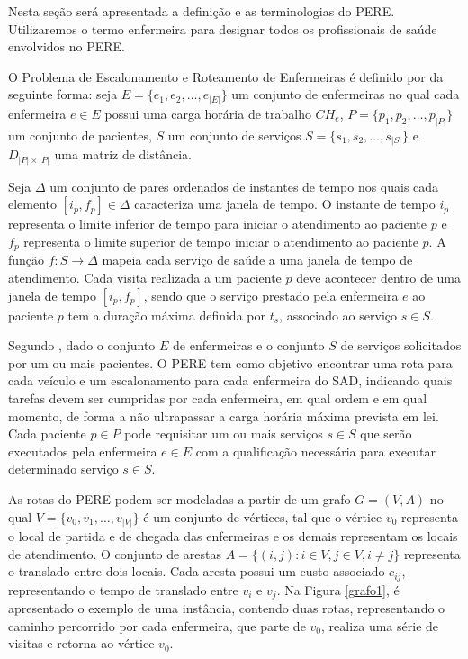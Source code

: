 Nesta seção será apresentada a definição e as terminologias do \ac{PERE}. Utilizaremos o termo enfermeira para designar todos os profissionais de saúde envolvidos no \ac{PERE}. 

O Problema de Escalonamento e Roteamento de Enfermeiras é definido por  da seguinte forma: seja $E = \{ e_1, e_2, \ldots, e_{|E|} \}$ um conjunto de enfermeiras no qual cada enfermeira $e\in E$ possui uma carga horária de trabalho $CH_e$, $P = \{p_1, p_2, \ldots, p_{|P|} \}$ um conjunto de pacientes, $S$ um conjunto de serviços $S = \{ s_1, s_2, \ldots, s_{|S|} \}$ e $D_{|P|\times |P|}$ uma matriz de distância. 

Seja $\Delta$ um conjunto de pares ordenados de instantes de tempo nos quais cada elemento $[i_p, f_p] \in \Delta$ caracteriza uma janela de tempo. O instante de tempo $i_{p}$ representa o limite inferior de tempo para iniciar o atendimento ao paciente $p$ e $f_{p}$ representa o limite superior de tempo iniciar o atendimento ao paciente $p$. A função $f: S \rightarrow \Delta$ mapeia cada serviço de saúde a uma janela de tempo de atendimento. Cada visita realizada a um paciente $p$ deve acontecer dentro de uma janela de tempo $[i_{p},f_{p}]$, sendo que o serviço prestado pela enfermeira $e$ ao paciente $p$ tem a duração máxima definida por $t_s$, associado ao serviço $s \in S$.

Segundo , dado o conjunto $E$ de enfermeiras e o conjunto $S$ de serviços solicitados por um ou mais pacientes. 
O \ac{PERE} tem como objetivo encontrar uma rota para cada veículo e um escalonamento para cada enfermeira do \ac{SAD}, indicando quais tarefas devem ser cumpridas por cada enfermeira, em qual ordem e em qual momento, de forma a não ultrapassar a carga horária máxima prevista em lei.
Cada paciente $p\in P$ pode requisitar um ou mais serviços $s \in S$ que serão executados pela enfermeira $e \in E$  com a qualificação necessária para executar determinado serviço $s \in S$. 

As rotas do \ac{PERE} podem ser modeladas a partir de um grafo  $G = (V, A)$ no qual $V= \{ v_0, v_1, \ldots, v_{|V|} \}$ é um conjunto de vértices, tal que o vértice $v_0$ representa o local de partida e de chegada das enfermeiras e os demais representam os locais de atendimento. O conjunto de arestas $A = \{(i,j): i\in V, j \in V, i \neq j\}$ representa o translado entre dois locais. 
Cada aresta possui um custo associado $c_{ij}$, representando o tempo de translado entre $v_i$ e $v_j$.
Na Figura \ref{grafo1}, é apresentado o exemplo de uma instância, contendo duas rotas, representando o caminho percorrido por cada enfermeira, que parte de $v_0$, realiza uma série de visitas e retorna ao vértice $v_0$.

